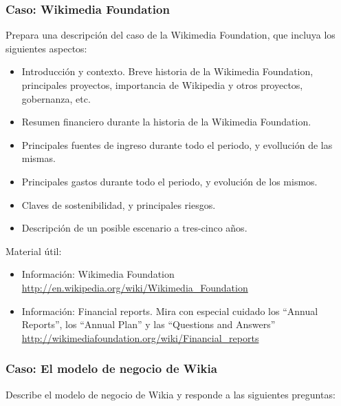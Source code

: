 \documentclass[a4paper,12pt]{article}
\begin{document}
\subsubsection{Caso: Wikimedia Foundation}
\label{sub:case-wikimedia}

Prepara una descripción del caso de la Wikimedia Foundation, que incluya los siguientes aspectos:

\begin{itemize}
\item Introducción y contexto. Breve historia de la Wikimedia Foundation, principales proyectos, importancia de Wikipedia y otros proyectos, gobernanza, etc.
\item Resumen financiero durante la historia de la Wikimedia Foundation.
\item Principales fuentes de ingreso durante todo el periodo, y evollución de las mismas.
\item Principales gastos durante todo el periodo, y evolución de los mismos.
\item Claves de sostenibilidad, y principales riesgos.
\item Descripción de un posible escenario a tres-cinco años.
\end{itemize}

Material útil:

\begin{itemize}
\item Información: Wikimedia Foundation \\
  \url{http://en.wikipedia.org/wiki/Wikimedia_Foundation}
\item Información: Financial reports. Mira con especial cuidado los ``Annual Reports'', los ``Annual Plan'' y las ``Questions and Answers'' \\
  \url{http://wikimediafoundation.org/wiki/Financial_reports}
\end{itemize}

\subsubsection{Caso: El modelo de negocio de Wikia}
\label{sub:case-wikia}


Describe el modelo de negocio de Wikia y responde a las siguientes preguntas:
\end{document}

